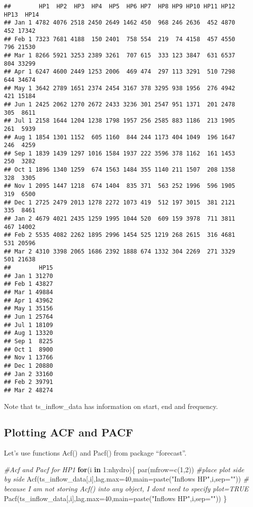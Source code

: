 \documentclass[
]{article}
\newenvironment{Shaded}{\begin{snugshade}}{\end{snugshade}}
\newcommand{\AttributeTok}[1]{\textcolor[rgb]{0.77,0.63,0.00}{#1}}
\newcommand{\CommentTok}[1]{\textcolor[rgb]{0.56,0.35,0.01}{\textit{#1}}}
\newcommand{\ControlFlowTok}[1]{\textcolor[rgb]{0.13,0.29,0.53}{\textbf{#1}}}
\newcommand{\DecValTok}[1]{\textcolor[rgb]{0.00,0.00,0.81}{#1}}
\newcommand{\FunctionTok}[1]{\textcolor[rgb]{0.00,0.00,0.00}{#1}}
\newcommand{\NormalTok}[1]{#1}
\newcommand{\SpecialCharTok}[1]{\textcolor[rgb]{0.00,0.00,0.00}{#1}}
\newcommand{\StringTok}[1]{\textcolor[rgb]{0.31,0.60,0.02}{#1}}
\begin{document}
\begin{verbatim}
##        HP1  HP2  HP3  HP4  HP5  HP6 HP7  HP8 HP9 HP10 HP11 HP12 HP13  HP14
## Jan 1 4782 4076 2518 2450 2649 1462 450  968 246 2636  452 4870  452 17342
## Feb 1 7323 7681 4188  150 2401  758 554  219  74 4158  457 4550  796 21530
## Mar 1 8266 5921 3253 2389 3261  707 615  333 123 3847  631 6537  804 33299
## Apr 1 6247 4600 2449 1253 2006  469 474  297 113 3291  510 7298  644 34674
## May 1 3642 2789 1651 2374 2454 3167 378 3295 938 1956  276 4942  421 15184
## Jun 1 2425 2062 1270 2672 2433 3236 301 2547 951 1371  201 2478  305  8611
## Jul 1 2158 1644 1204 1238 1798 1957 256 2585 883 1186  213 1905  261  5939
## Aug 1 1854 1301 1152  605 1160  844 244 1173 404 1049  196 1647  246  4259
## Sep 1 1839 1439 1297 1016 1584 1937 222 3596 378 1162  161 1453  250  3282
## Oct 1 1896 1340 1259  674 1563 1484 355 1140 211 1507  208 1358  328  3305
## Nov 1 2095 1447 1218  674 1404  835 371  563 252 1996  596 1905  319  6500
## Dec 1 2725 2479 2013 1278 2272 1073 419  512 197 3015  381 2121  335  8461
## Jan 2 4679 4021 2435 1259 1995 1044 520  609 159 3978  711 3811  467 14002
## Feb 2 5535 4082 2262 1895 2996 1454 525 1219 268 2615  316 4681  531 20596
## Mar 2 4310 3398 2065 1686 2392 1888 674 1332 304 2269  271 3329  501 21638
##        HP15
## Jan 1 31270
## Feb 1 43827
## Mar 1 49884
## Apr 1 43962
## May 1 35156
## Jun 1 25764
## Jul 1 18109
## Aug 1 13320
## Sep 1  8225
## Oct 1  8900
## Nov 1 13766
## Dec 1 20880
## Jan 2 33160
## Feb 2 39791
## Mar 2 48274
\end{verbatim}

Note that ts\_inflow\_data has information on start, end and frequency.

\hypertarget{plotting-acf-and-pacf}{%
\subsection{Plotting ACF and PACF}\label{plotting-acf-and-pacf}}

Let's use functions Acf() and Pacf() from package ``forecast''.

\begin{Shaded}
\begin{Highlighting}[]
\CommentTok{\#Acf and Pacf for HP1}
\ControlFlowTok{for}\NormalTok{(i }\ControlFlowTok{in} \DecValTok{1}\SpecialCharTok{:}\NormalTok{nhydro)\{}
  \FunctionTok{par}\NormalTok{(}\AttributeTok{mfrow=}\FunctionTok{c}\NormalTok{(}\DecValTok{1}\NormalTok{,}\DecValTok{2}\NormalTok{))  }\CommentTok{\#place plot side by side}
  \FunctionTok{Acf}\NormalTok{(ts\_inflow\_data[,i],}\AttributeTok{lag.max=}\DecValTok{40}\NormalTok{,}\AttributeTok{main=}\FunctionTok{paste}\NormalTok{(}\StringTok{"Inflows HP"}\NormalTok{,i,}\AttributeTok{sep=}\StringTok{""}\NormalTok{)) }
  \CommentTok{\# because I am not storing Acf() into any object, I don\textquotesingle{}t need to specify plot=TRUE }
  \FunctionTok{Pacf}\NormalTok{(ts\_inflow\_data[,i],}\AttributeTok{lag.max=}\DecValTok{40}\NormalTok{,}\AttributeTok{main=}\FunctionTok{paste}\NormalTok{(}\StringTok{"Inflows HP"}\NormalTok{,i,}\AttributeTok{sep=}\StringTok{""}\NormalTok{))}
\NormalTok{\}}
\end{Highlighting}
\end{Shaded}
\end{document}
